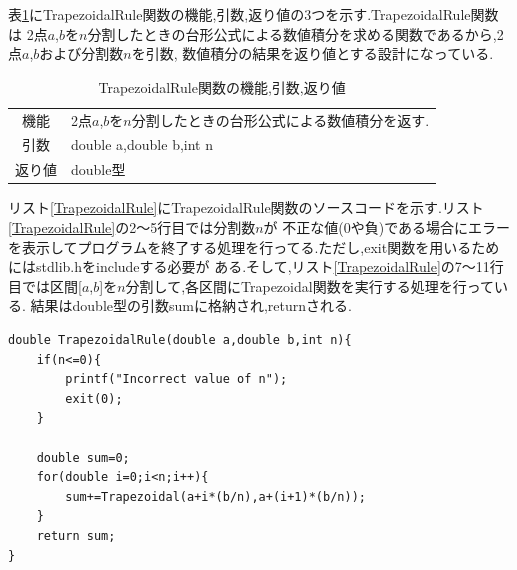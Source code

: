 \documentclass[dvipdfmx]{jarticle}
\begin{document}
表\ref{TrapezoidalRuletable}にTrapezoidalRule関数の機能,引数,返り値の3つを示す.TrapezoidalRule関数は
2点$a$,$b$を$n$分割したときの台形公式による数値積分を求める関数であるから,2点$a$,$b$および分割数$n$を引数,
数値積分の結果を返り値とする設計になっている.

\begin{table}[H]
  \caption{TrapezoidalRule関数の機能,引数,返り値}
  \label{TrapezoidalRuletable}
  \begin{center}
      \begin{tabular}{c|l}\hline
    機能 & 2点$a$,$b$を$n$分割したときの台形公式による数値積分を返す.\\
    引数 & double a,double b,int n\\
    返り値 & double型 \\ \hline
      \end{tabular}
  \end{center}
  \end{table}

  リスト\ref{TrapezoidalRule}にTrapezoidalRule関数のソースコードを示す.リスト\ref{TrapezoidalRule}の2～5行目では分割数$n$が
  不正な値(0や負)である場合にエラーを表示してプログラムを終了する処理を行ってる.ただし,exit関数を用いるためにはstdlib.hをincludeする必要が
  ある.そして,リスト\ref{TrapezoidalRule}の7～11行目では区間[$a$,$b$]を$n$分割して,各区間にTrapezoidal関数を実行する処理を行っている.
  結果はdouble型の引数sumに格納され,returnされる.
      \begin{lstlisting}[basicstyle=\ttfamily\footnotesize, frame=single,label=TrapezoidalRule,caption=TrapezoidalRule関数]
double TrapezoidalRule(double a,double b,int n){
    if(n<=0){
        printf("Incorrect value of n");
        exit(0);
    }

    double sum=0;
    for(double i=0;i<n;i++){
        sum+=Trapezoidal(a+i*(b/n),a+(i+1)*(b/n));
    }
    return sum;
}
            \end{lstlisting}
\end{document}
